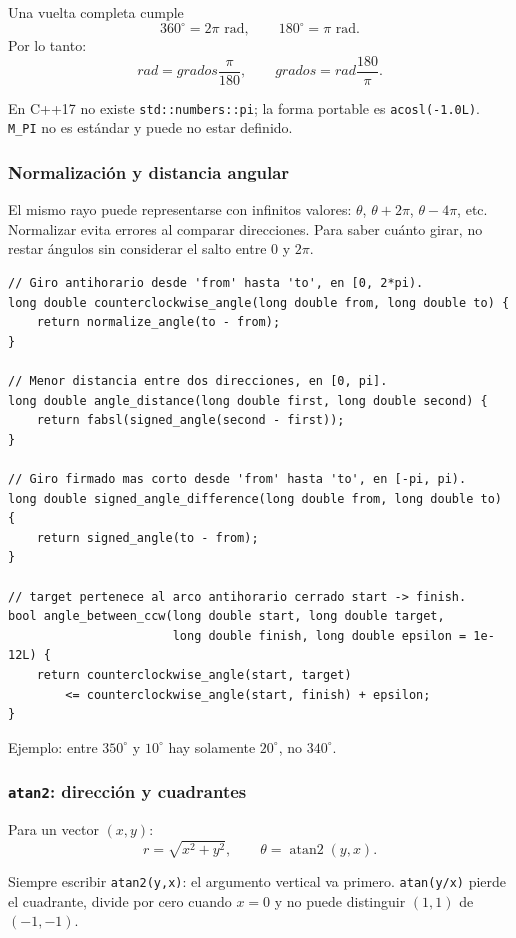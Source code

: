 Una vuelta completa cumple
\[
360^\circ=2\pi\text{ rad},\qquad
180^\circ=\pi\text{ rad}.
\]
Por lo tanto:
\[
rad=grados\frac{\pi}{180},\qquad
grados=rad\frac{180}{\pi}.
\]

En C++17 no existe \texttt{std::numbers::pi}; la forma portable es
\texttt{acosl(-1.0L)}. \texttt{M\_PI} no es est\'andar y puede no estar definido.

\subsubsection{Normalizaci\'on y distancia angular}

El mismo rayo puede representarse con infinitos valores:
$\theta$, $\theta+2\pi$, $\theta-4\pi$, etc. Normalizar evita errores al comparar
direcciones. Para saber cu\'anto girar, no restar \'angulos sin considerar el
salto entre $0$ y $2\pi$.

\begin{lstlisting}[style=cpp]
// Giro antihorario desde 'from' hasta 'to', en [0, 2*pi).
long double counterclockwise_angle(long double from, long double to) {
    return normalize_angle(to - from);
}

// Menor distancia entre dos direcciones, en [0, pi].
long double angle_distance(long double first, long double second) {
    return fabsl(signed_angle(second - first));
}

// Giro firmado mas corto desde 'from' hasta 'to', en [-pi, pi).
long double signed_angle_difference(long double from, long double to) {
    return signed_angle(to - from);
}

// target pertenece al arco antihorario cerrado start -> finish.
bool angle_between_ccw(long double start, long double target,
                       long double finish, long double epsilon = 1e-12L) {
    return counterclockwise_angle(start, target)
        <= counterclockwise_angle(start, finish) + epsilon;
}
\end{lstlisting}

Ejemplo: entre $350^\circ$ y $10^\circ$ hay solamente $20^\circ$, no
$340^\circ$.

\subsubsection{\texttt{atan2}: direcci\'on y cuadrantes}

Para un vector $(x,y)$:
\[
r=\sqrt{x^2+y^2},\qquad \theta=\operatorname{atan2}(y,x).
\]

Siempre escribir \texttt{atan2(y,x)}: el argumento vertical va primero.
\texttt{atan(y/x)} pierde el cuadrante, divide por cero cuando $x=0$ y no puede
distinguir $(1,1)$ de $(-1,-1)$.

